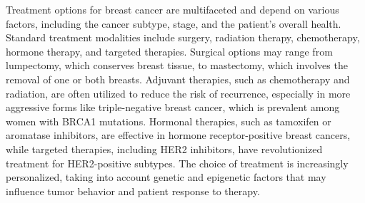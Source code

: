 Treatment options for breast cancer are multifaceted and depend on various
factors, including the cancer subtype, stage, and the patient's overall health.
Standard treatment modalities include surgery, radiation therapy, chemotherapy,
hormone therapy, and targeted therapies. Surgical options may range from
lumpectomy, which conserves breast tissue, to mastectomy, which involves the
removal of one or both
breasts\supercite{metcalfe_contralateral_2014,wu_breast_2014}. Adjuvant
therapies, such as chemotherapy and radiation, are often utilized to reduce the
risk of recurrence, especially in more aggressive forms like triple-negative
breast cancer, which is prevalent among women with BRCA1
mutations\supercite{metcalfe_contralateral_2014}. Hormonal therapies, such as
tamoxifen or aromatase inhibitors, are effective in hormone receptor-positive
breast cancers, while targeted therapies, including HER2 inhibitors, have
revolutionized treatment for HER2-positive
subtypes\supercite{eccles_critical_2013,pace_breast_2016}. The choice of
treatment is increasingly personalized, taking into account genetic and
epigenetic factors that may influence tumor behavior and patient response to
therapy\supercite{khakpour_methylomics_2017}.
